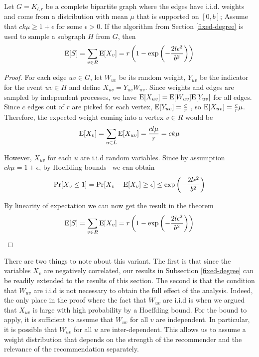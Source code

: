 \begin{thm}
Let $G=K_{l,r}$ be a complete bipartite graph where the edges have i.i.d. weights and come from a distribution with mean $\mu$ that is supported on $[0,b]$; Assume that $ck\mu \geq 1+\epsilon$ for some $\epsilon > 0$. If the algorithm from Section \ref{fixed-degree} is used to sample a subgraph $H$ from $G$, then
\[ \text{E}[S] = \sum_{v\in R} \text{E}[X_v] = r\left(1-\exp\left(-\frac{2l\epsilon^2}{b^2}\right)\right) \]
\end{thm}

\begin{proof}
For each edge $uv\in G$, let $W_{uv}$ be its random weight, $Y_{uv}$ be
the indicator for the event $uv\in H$ and define $X_{uv} = Y_{uv}
W_{uv}$. Since weights and edges are sampled by independent processes,
we have $\text{E}[X_{uv}] = \text{E}[W_{uv}]\text{E}[Y_{uv}]$ for all edges. Since $c$
edges out of $r$ are picked for each vertex, $\text{E}[Y_{uv}] = \frac{c}{r}$
, so $\text{E}[X_{uv}] = \frac{c}{r}\mu$. Therefore, the expected weight
coming into a vertex $v\in R$ would be
\[ \text{E}[X_v] = \sum_{u\in L} \text{E}[X_{uv}] = \frac{cl\mu}{r} = ck\mu\]

However, $X_{uv}$ for each $u$ are i.i.d random variables. Since by
assumption $ck\mu = 1+\epsilon$, by Hoeffding bounds~\cite{Hoeffding1963}
we can obtain
\[ \Pr[X_v \leq 1] = \Pr[X_v - \text{E}[X_v] \geq \epsilon] \leq \exp\left(-\frac{2l\epsilon^2}{b^2}\right) \]

By linearity of expectation we can now get the result in the theorem
\[ \text{E}[S] = \sum_{v\in R} \text{E}[X_v] = r\left(1-\exp\left(-\frac{2l\epsilon^2}{b^2}\right)\right) \]
\end{proof}

There are two things to note about this variant. The first is that
since the variables $X_v$ are negatively correlated, our results in
Subsection \ref{fixed-degree} can be readily extended to the results of this
section. The second is that the condition that $W_{uv}$ are i.i.d
is not necessary to obtain the full effect of the analysis. Indeed,
the only place in the proof where the fact that $W_{uv}$ are i.i.d
is when we argued that $X_{uv}$ is large with high probability by a
Hoeffding bound. For the bound to apply, it is sufficient to assume
that $W_{uv}$ for all $v$ are independent. In particular, it is
possible that $W_{uv}$ for all $u$ are inter-dependent. This allows
us to assume a weight distribution that depends on the strength of
the recommender and the relevance of the recommendation separately.
